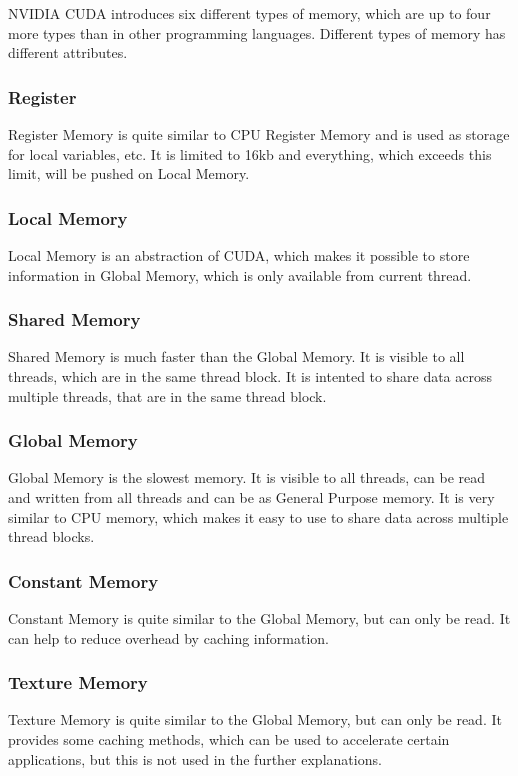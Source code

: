 \documentclass[conference]{IEEEtran}
\begin{document}
		NVIDIA CUDA introduces six different types of memory, which are up to four more types than in other programming languages. Different types of memory has different attributes.

		\subsubsection{Register}
			Register Memory is quite similar to CPU Register Memory and is used as storage for local variables, etc. It is limited to 16kb and everything, which exceeds this limit, will be pushed on Local Memory. \cite{accsql}
		\subsubsection{Local Memory}
			Local Memory is an abstraction of CUDA, which makes it possible to store information in Global Memory, which is only available from current thread.\cite{accsql}
		\subsubsection{Shared Memory}
			Shared Memory is much faster than the Global Memory. It is visible to all threads, which are in the same thread block. It is intented to share data across multiple threads, that are in the same thread block.\cite{cudalite} \cite{cudap}
		\subsubsection{Global Memory}
			Global Memory is the slowest memory. It is visible to all threads, can be read and written from all threads and can be as General Purpose memory. It is very similar to CPU memory, which makes it easy to use to share data across multiple thread blocks. \cite{cudalite}
		\subsubsection{Constant Memory}
			Constant Memory is quite similar to the Global Memory, but can only be read. It can help to reduce overhead by caching information. \cite{cudalite} \cite{accsql}  
		\subsubsection{Texture Memory}
			Texture Memory is quite similar to the Global Memory, but can only be read. It provides some caching methods, which can be used to accelerate certain applications, but this is not used in the further explanations. \cite{cudap}
		
\end{document}
